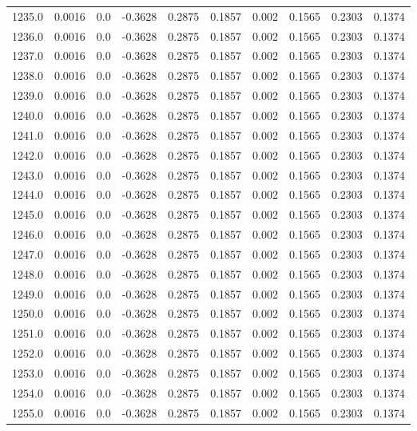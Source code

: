 \begin{longtable}{lrrrrrrrrr}
1235.0 & 0.0016 & 0.0 & -0.3628 & 0.2875 & 0.1857 & 0.002 & 0.1565 & 0.2303 & 0.1374 \\
1236.0 & 0.0016 & 0.0 & -0.3628 & 0.2875 & 0.1857 & 0.002 & 0.1565 & 0.2303 & 0.1374 \\
1237.0 & 0.0016 & 0.0 & -0.3628 & 0.2875 & 0.1857 & 0.002 & 0.1565 & 0.2303 & 0.1374 \\
1238.0 & 0.0016 & 0.0 & -0.3628 & 0.2875 & 0.1857 & 0.002 & 0.1565 & 0.2303 & 0.1374 \\
1239.0 & 0.0016 & 0.0 & -0.3628 & 0.2875 & 0.1857 & 0.002 & 0.1565 & 0.2303 & 0.1374 \\
1240.0 & 0.0016 & 0.0 & -0.3628 & 0.2875 & 0.1857 & 0.002 & 0.1565 & 0.2303 & 0.1374 \\
1241.0 & 0.0016 & 0.0 & -0.3628 & 0.2875 & 0.1857 & 0.002 & 0.1565 & 0.2303 & 0.1374 \\
1242.0 & 0.0016 & 0.0 & -0.3628 & 0.2875 & 0.1857 & 0.002 & 0.1565 & 0.2303 & 0.1374 \\
1243.0 & 0.0016 & 0.0 & -0.3628 & 0.2875 & 0.1857 & 0.002 & 0.1565 & 0.2303 & 0.1374 \\
1244.0 & 0.0016 & 0.0 & -0.3628 & 0.2875 & 0.1857 & 0.002 & 0.1565 & 0.2303 & 0.1374 \\
1245.0 & 0.0016 & 0.0 & -0.3628 & 0.2875 & 0.1857 & 0.002 & 0.1565 & 0.2303 & 0.1374 \\
1246.0 & 0.0016 & 0.0 & -0.3628 & 0.2875 & 0.1857 & 0.002 & 0.1565 & 0.2303 & 0.1374 \\
1247.0 & 0.0016 & 0.0 & -0.3628 & 0.2875 & 0.1857 & 0.002 & 0.1565 & 0.2303 & 0.1374 \\
1248.0 & 0.0016 & 0.0 & -0.3628 & 0.2875 & 0.1857 & 0.002 & 0.1565 & 0.2303 & 0.1374 \\
1249.0 & 0.0016 & 0.0 & -0.3628 & 0.2875 & 0.1857 & 0.002 & 0.1565 & 0.2303 & 0.1374 \\
1250.0 & 0.0016 & 0.0 & -0.3628 & 0.2875 & 0.1857 & 0.002 & 0.1565 & 0.2303 & 0.1374 \\
1251.0 & 0.0016 & 0.0 & -0.3628 & 0.2875 & 0.1857 & 0.002 & 0.1565 & 0.2303 & 0.1374 \\
1252.0 & 0.0016 & 0.0 & -0.3628 & 0.2875 & 0.1857 & 0.002 & 0.1565 & 0.2303 & 0.1374 \\
1253.0 & 0.0016 & 0.0 & -0.3628 & 0.2875 & 0.1857 & 0.002 & 0.1565 & 0.2303 & 0.1374 \\
1254.0 & 0.0016 & 0.0 & -0.3628 & 0.2875 & 0.1857 & 0.002 & 0.1565 & 0.2303 & 0.1374 \\
1255.0 & 0.0016 & 0.0 & -0.3628 & 0.2875 & 0.1857 & 0.002 & 0.1565 & 0.2303 & 0.1374 \\

\end{longtable}
